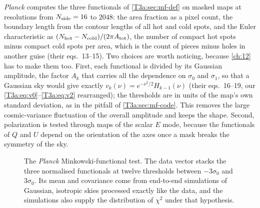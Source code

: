 \textit{Planck} computes the three functionals of \cref{T3a:sec:mf-def} on masked maps at resolutions from $N_{\rm side}=16$ to $2048$: the area fraction as a pixel count, the boundary length from the contour lengths of all hot and cold spots, and the Euler characteristic as $(N_{\rm hot}-N_{\rm cold})/(2\pi A_{\rm tot})$, the number of compact hot spots minus compact cold spots per area, which is the count of pieces minus holes in another guise \cite{Planck2018VII} (their eqs.~13--15). Two choices are worth noticing, because \cref{ch:12} has to make them too. First, each functional is divided by its Gaussian amplitude, the factor $A_k$ that carries all the dependence on $\sigma_0$ and $\sigma_1$, so that a Gaussian sky would give exactly $v_k(\nu)=e^{-\nu^2/2}H_{k-1}(\nu)$ (their eqs.~16--19, our \eqref{T3a:eq:v0}--\eqref{T3a:eq:v2} rearranged); the thresholds are in units of the map's own standard deviation, as in the pitfall of \cref{T3a:sec:mf-code}. This removes the large cosmic-variance fluctuation of the overall amplitude and keeps the shape. Second, polarization is tested through maps of the scalar $E$ mode, because the functionals of $Q$ and $U$ depend on the orientation of the axes once a mask breaks the symmetry of the sky.

\begin{figure}[htbp]
\centering
{}
\caption{The \textit{Planck} Minkowski-functional test. The data vector stacks the three normalised functionals at twelve thresholds between $-3\sigma_0$ and $3\sigma_0$. Its mean and covariance come from end-to-end simulations of Gaussian, isotropic skies processed exactly like the data, and the simulations also supply the distribution of $\chi^2$ under that hypothesis.}
\label{T3a:fig:planck-mf}
\end{figure}

